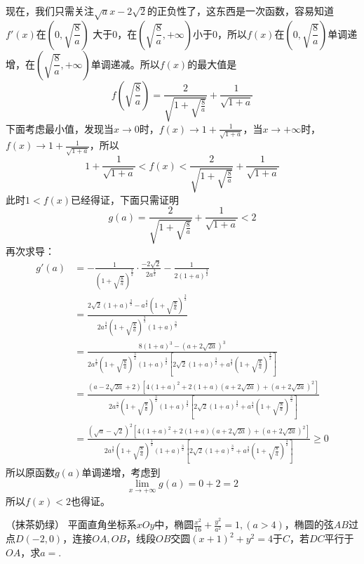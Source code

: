 \begin{solution}
现在，我们只需关注$\sqrt{a}x-2\sqrt2$的正负性了，这东西是一次函数，容易知道$f'(x)$在$(0,\sqrt{\dfrac{8}{a}})$
大于0，在$(\sqrt{\dfrac{8}{a}},+\infty)$小于0，所以$f(x)$在$(0,\sqrt{\dfrac{8}{a}})$单调递增，在$(\sqrt{\dfrac{8}{a}},+\infty)$单调递减。所以$f(x)$的最大值是\[f(\sqrt{\dfrac{8}{a}})=\frac{2}{\sqrt{1+\sqrt{\frac{8}{a}}}}+\frac{1}{\sqrt{1+a}}\]
下面考虑最小值，发现当$x\rightarrow 0$时，$f(x)\rightarrow 1+\frac{1}{\sqrt{1+a}}$，当$x\rightarrow +\infty$时，$f(x)\rightarrow 1+\frac{1}{\sqrt{1+a}}$，所以\[1+\frac{1}{\sqrt{1+a}}<f(x)<\frac{2}{\sqrt{1+\sqrt{\frac{8}{a}}}}+\frac{1}{\sqrt{1+a}}\]
此时$1<f(x)$已经得证，下面只需证明\[g(a)=\frac{2}{\sqrt{1+\sqrt{\frac{8}{a}}}}+\frac{1}{\sqrt{1+a}}<2\]
再次求导：
\begin{align*}g'(a)&=-\frac{1}{\left(1+\sqrt{\frac{8}{a}}\right)^{\frac{3}{2}}}\cdot\frac{-2\sqrt2}{2a^{\frac{3}{2}}}-\frac{1}{2(1+a)^{\frac{3}{2}}}\\&=\frac{2\sqrt{2}(1+a)^{\frac{3}{2}}-a^{\frac{3}{2}}\left(1+\sqrt{\frac{8}{a}}\right)^{\frac{3}{2}}}{2a^{\frac{3}{2}}\left(1+\sqrt{\frac{8}{a}}\right)^{\frac{3}{2}}(1+a)^{\frac{3}{2}}}\\&=\frac{8(1+a)^3-\left(a+2\sqrt{2a}\right)^3}{2a^{\frac{3}{2}}\left(1+\sqrt{\frac{8}{a}}\right)^{\frac{3}{2}}(1+a)^{\frac{3}{2}}\left[2\sqrt{2}(1+a)^{\frac{3}{2}}+a^{\frac{3}{2}}\left(1+\sqrt{\frac{8}{a}}\right)^{\frac{3}{2}}\right]}\\&=\frac{(a-2\sqrt{2a}+2)\left[4(1+a)^2+2(1+a)(a+2\sqrt{2a})+(a+2\sqrt{2a})^2\right]}{2a^{\frac{3}{2}}\left(1+\sqrt{\frac{8}{a}}\right)^{\frac{3}{2}}(1+a)^{\frac{3}{2}}\left[2\sqrt{2}(1+a)^{\frac{3}{2}}+a^{\frac{3}{2}}\left(1+\sqrt{\frac{8}{a}}\right)^{\frac{3}{2}}\right]}\\&=\frac{(\sqrt{a}-\sqrt{2})^2\left[4(1+a)^2+2(1+a)(a+2\sqrt{2a})+(a+2\sqrt{2a})^2\right]}{2a^{\frac{3}{2}}\left(1+\sqrt{\frac{8}{a}}\right)^{\frac{3}{2}}(1+a)^{\frac{3}{2}}\left[2\sqrt{2}(1+a)^{\frac{3}{2}}+a^{\frac{3}{2}}\left(1+\sqrt{\frac{8}{a}}\right)^{\frac{3}{2}}\right]}\geq0\end{align*}
所以原函数$g(a)$单调递增，考虑到\[\lim_{x\rightarrow +\infty}g(a)=0+2=2\]所以$f(x)<2$也得证。
\end{solution}
\newpage
\begin{example}{（抹茶奶绿）}{}
    平面直角坐标系$xOy$中，椭圆$\frac{x^2}{16}+\frac{y^2}{a^2}=1,(a>4)$，椭圆的弦$AB$过点$D(-2,0)$，连接$OA,OB$，线段$OB$交圆$(x+1)^2+y^2=4$于$C$，若$DC$平行于$OA$，求$a=$\underline{\hspace{1.2cm}}.
\end{example}
